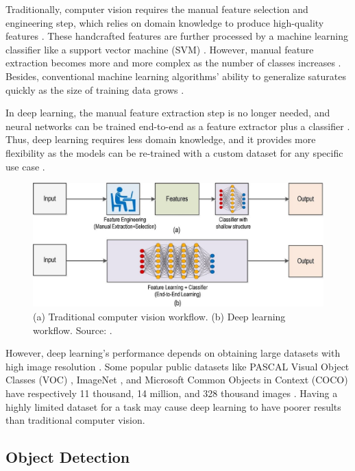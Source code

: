 \documentclass[a4paper, 11pt, oneside]{article}
\begin{document}
Traditionally, computer vision requires the manual feature selection and engineering step, which relies on domain knowledge
to produce high-quality features \cite{elgendy2020deep, zhao2019object, o2019deep}. These handcrafted features are further
processed by a machine learning classifier like a support vector machine (SVM)
\cite{elgendy2020deep, zhao2019object, o2019deep}. However, manual feature extraction becomes more and more complex as
the number of classes increases \cite{o2019deep}. Besides, conventional machine learning algorithms' ability to
generalize saturates quickly as the size of training data grows \cite{qin2015underwater}.

In deep learning, the manual feature extraction step is no longer needed, and neural networks can be trained end-to-end
as a feature extractor plus a classifier \cite{elgendy2020deep, o2019deep}. Thus, deep learning requires less domain
knowledge, and it provides more flexibility as the models can be re-trained with a custom dataset for any specific use
case \cite{o2019deep}.

\begin{figure}[ht]
  \begin{center}
    \includegraphics[width=.7\textwidth]{deep_learning_vs_traditional_computer_vision.png}
  \end{center}
  \caption{(a) Traditional computer vision workflow. (b) Deep learning workflow. Source: \cite{o2019deep}.}
\end{figure}

However, deep learning's performance depends on obtaining large datasets with high image resolution \cite{o2019deep}.
Some popular public datasets like PASCAL Visual Object Classes (VOC) \cite{everingham2010pascal}, ImageNet
\cite{russakovsky2015imagenet}, and Microsoft Common Objects in Context (COCO) \cite{lin2014microsoft}
have respectively 11 thousand, 14 million, and 328 thousand images \cite{liu2020deep}. Having a highly limited dataset
for a task may cause deep learning to have poorer results than traditional computer vision.

\subsection{Object Detection}
\end{document}
